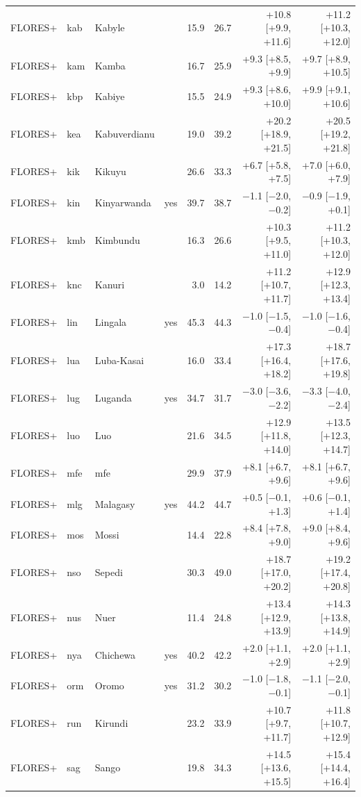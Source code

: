 {\begin{longtable}{@{}lllcrrrr@{}}
FLORES+ & kab & Kabyle &  & 15.9 & 26.7 & +10.8 [+9.9, +11.6] & +11.2 [+10.3, +12.0] \\
FLORES+ & kam & Kamba &  & 16.7 & 25.9 & +9.3 [+8.5, +9.9] & +9.7 [+8.9, +10.5] \\
FLORES+ & kbp & Kabiye &  & 15.5 & 24.9 & +9.3 [+8.6, +10.0] & +9.9 [+9.1, +10.6] \\
FLORES+ & kea & Kabuverdianu &  & 19.0 & 39.2 & +20.2 [+18.9, +21.5] & +20.5 [+19.2, +21.8] \\
FLORES+ & kik & Kikuyu &  & 26.6 & 33.3 & +6.7 [+5.8, +7.5] & +7.0 [+6.0, +7.9] \\
FLORES+ & kin & Kinyarwanda & yes & 39.7 & 38.7 & $-$1.1 [$-$2.0, $-$0.2] & $-$0.9 [$-$1.9, +0.1] \\
FLORES+ & kmb & Kimbundu &  & 16.3 & 26.6 & +10.3 [+9.5, +11.0] & +11.2 [+10.3, +12.0] \\
FLORES+ & knc & Kanuri &  & 3.0 & 14.2 & +11.2 [+10.7, +11.7] & +12.9 [+12.3, +13.4] \\
FLORES+ & lin & Lingala & yes & 45.3 & 44.3 & $-$1.0 [$-$1.5, $-$0.4] & $-$1.0 [$-$1.6, $-$0.4] \\
FLORES+ & lua & Luba-Kasai &  & 16.0 & 33.4 & +17.3 [+16.4, +18.2] & +18.7 [+17.6, +19.8] \\
FLORES+ & lug & Luganda & yes & 34.7 & 31.7 & $-$3.0 [$-$3.6, $-$2.2] & $-$3.3 [$-$4.0, $-$2.4] \\
FLORES+ & luo & Luo &  & 21.6 & 34.5 & +12.9 [+11.8, +14.0] & +13.5 [+12.3, +14.7] \\
FLORES+ & mfe & mfe &  & 29.9 & 37.9 & +8.1 [+6.7, +9.6] & +8.1 [+6.7, +9.6] \\
FLORES+ & mlg & Malagasy & yes & 44.2 & 44.7 & +0.5 [$-$0.1, +1.3] & +0.6 [$-$0.1, +1.4] \\
FLORES+ & mos & Mossi &  & 14.4 & 22.8 & +8.4 [+7.8, +9.0] & +9.0 [+8.4, +9.6] \\
FLORES+ & nso & Sepedi &  & 30.3 & 49.0 & +18.7 [+17.0, +20.2] & +19.2 [+17.4, +20.8] \\
FLORES+ & nus & Nuer &  & 11.4 & 24.8 & +13.4 [+12.9, +13.9] & +14.3 [+13.8, +14.9] \\
FLORES+ & nya & Chichewa & yes & 40.2 & 42.2 & +2.0 [+1.1, +2.9] & +2.0 [+1.1, +2.9] \\
FLORES+ & orm & Oromo & yes & 31.2 & 30.2 & $-$1.0 [$-$1.8, $-$0.1] & $-$1.1 [$-$2.0, $-$0.1] \\
FLORES+ & run & Kirundi &  & 23.2 & 33.9 & +10.7 [+9.7, +11.7] & +11.8 [+10.7, +12.9] \\
FLORES+ & sag & Sango &  & 19.8 & 34.3 & +14.5 [+13.6, +15.5] & +15.4 [+14.4, +16.4] \\

\end{longtable}}
